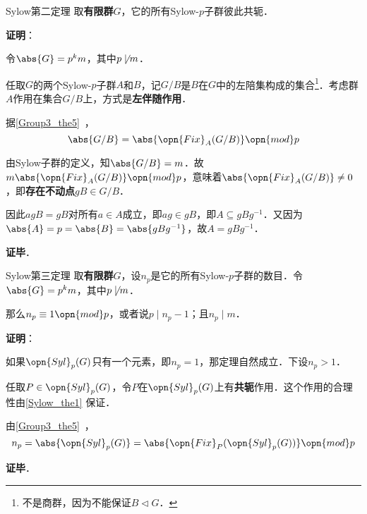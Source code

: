 \begin{theorem}{Sylow第二定理}\label{Sylow_the1}
取\textbf{有限群}$G$，它的所有Sylow-$p$子群彼此共轭．
\end{theorem}

\textbf{证明}：

令$\abs{G}=p^km$，其中$p\not\mid m$．

任取$G$的两个Sylow-$p$子群$A$和$B$，记$G/B$是$B$在$G$中的左陪集构成的集合\footnote{不是商群，因为不能保证$B\vartriangleleft G$．}．考虑群$A$作用在集合$G/B$上，方式是\textbf{左伴随作用}．

据\autoref{Group3_the5}~，
\begin{equation}
\abs{G/B} = \abs{\opn{Fix}_A(G/B)} \opn{mod} p
\end{equation}

由Sylow子群的定义，知$\abs{G/B}=m$．故$m\abs{\opn{Fix}_A(G/B)} \opn{mod} p$，意味着$\abs{\opn{Fix}_A(G/B)}\neq 0$，即\textbf{存在不动点}$gB\in G/B$．

因此$agB=gB$对所有$a\in A$成立，即$ag\in gB$，即$A\subseteq gBg^{-1}$．又因为$\abs{A}=p=\abs{B}=\abs{gBg^{-1}}$，故$A=gBg^{-1}$．


\textbf{证毕}．




\begin{theorem}{Sylow第三定理}
取\textbf{有限群}$G$，设$n_p$是它的所有Sylow-$p$子群的数目．令$\abs{G}=p^km$，其中$p\not\mid m$．

那么$n_p\equiv 1\opn{mod} p$，或者说$p\mid n_p-1$；且$n_p\mid m$．
\end{theorem}

\textbf{证明}：

如果$\opn{Syl}_p(G)$只有一个元素，即$n_p=1$，那定理自然成立．下设$n_p>1$．

任取$P\in\opn{Syl}_p(G)$，令$P$在$\opn{Syl}_p(G)$上有\textbf{共轭}作用．这个作用的合理性由\autoref{Sylow_the1} 保证．

由\autoref{Group3_the5}~，
\begin{equation}
n_p=\abs{\opn{Syl}_p(G)}=\abs{\opn{Fix}_P(\opn{Syl}_p(G))}\opn{mod}p
\end{equation}



\textbf{证毕}．






















